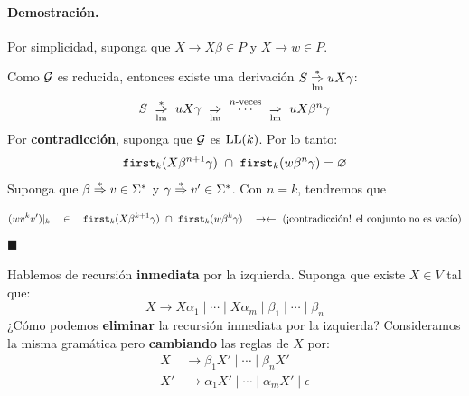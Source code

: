 \paragraph{Demostración.} Por simplicidad, suponga que $X \to X\beta \in P$ y $X \to w \in P$. \medbreak

Como $\mathcal{G}$ es reducida, entonces existe una derivación $S \underset{\mathrm{lm}}{\overset{*}{\Rightarrow}} uX\gamma$:
$$
    S \ \overunder{\Rightarrow}{\mathrm{lm}}{*} \ uX\gamma \ \overunder{\Rightarrow}{\mathrm{lm}}{} \ \overset{n\text{-veces}}{\cdots}\ \overunder{\Rightarrow}{\mathrm{lm}}{} \ uX \beta^n\gamma
$$
Por \textbf{contradicción}, suponga que $\mathcal{G}$ es $\text{LL}(k)$. Por lo tanto:
$$
    \texttt{first}_k(X\beta^{n+1}\gamma) \ \cap \ \texttt{first}_k(w \beta^n \gamma) = \varnothing
$$
Suponga que $\beta \underset{}{\overset{*}{\Rightarrow}} v \in \Sigma^*$ y $\gamma \underset{}{\overset{*}{\Rightarrow}} v' \in \Sigma^*$. Con $n = k$, tendremos que
$$
    (wv^k v')|_k \quad \in \quad \texttt{first}_k(X\beta^{k+1}\gamma) \ \cap \ \texttt{first}_k(w \beta^k\gamma) \quad \rightarrow\leftarrow \text{ (¡contradicción! el conjunto no es vacío)}
$$
\hfill $\blacksquare$ \bigbreak

Hablemos de recursión \textbf{inmediata} por la izquierda. Suponga que existe $X \in V$ tal que:
$$
    X \to X \alpha_1 \mid \cdots \mid X \alpha_m \mid \beta_1 \mid \cdots \mid \beta_n
$$
¿Cómo podemos \textbf{eliminar} la recursión inmediata por la izquierda? Consideramos la misma gramática pero \textbf{cambiando} las reglas de $X$ por:
\begin{align*}
    X  & \to \beta_1 X' \mid \cdots \mid \beta_n X'                 \\
    X' & \to \alpha_1 X' \mid \cdots \mid \alpha_m X' \mid \epsilon
\end{align*}


